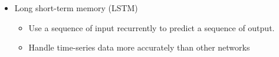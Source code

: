 {\begin{itemize}
\begin{itemize}
            \item A decoder using deconvolution operation to transform the latent space representation back to the original size field
        \end{itemize}
    \item Long short-term memory (LSTM)
        \begin{itemize}
            \item Use a sequence of input recurrently to predict a sequence of output.
            
            \item Handle time-series data more accurately than other networks
        \end{itemize}
        
\end{itemize}

}




